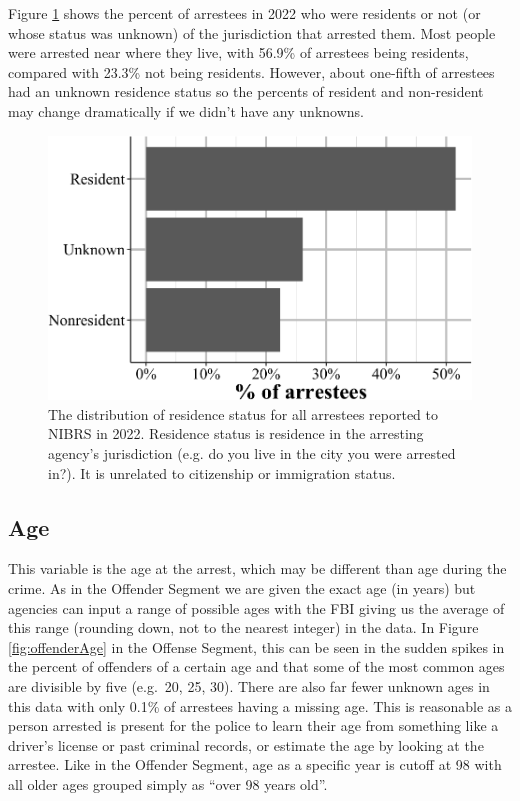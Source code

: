 \documentclass[
  12pt,
  openany]{book}
\begin{document}
Figure \ref{fig:arresteeResidenceStatus} shows the percent of arrestees in 2022 who were residents or not (or whose status was unknown) of the jurisdiction that arrested them. Most people were arrested near where they live, with 56.9\% of arrestees being residents, compared with 23.3\% not being residents. However, about one-fifth of arrestees had an unknown residence status so the percents of resident and non-resident may change dramatically if we didn't have any unknowns.

\begin{figure}

{\centering \includegraphics[width=0.9\linewidth]{16_nibrs_arrestee_files/figure-latex/arresteeResidenceStatus-1} 

}

\caption{The distribution of residence status for all arrestees reported to NIBRS in 2022. Residence status is residence in the arresting agency's jurisdiction (e.g. do you live in the city you were arrested in?). It is unrelated to citizenship or immigration status.}\label{fig:arresteeResidenceStatus}
\end{figure}

\subsection{Age}\label{age-4}

This variable is the age at the arrest, which may be different than age during the crime. As in the Offender Segment we are given the exact age (in years) but agencies can input a range of possible ages with the FBI giving us the average of this range (rounding down, not to the nearest integer) in the data. In Figure \ref{fig:offenderAge} in the Offense Segment, this can be seen in the sudden spikes in the percent of offenders of a certain age and that some of the most common ages are divisible by five (e.g.~20, 25, 30). There are also far fewer unknown ages in this data with only 0.1\% of arrestees having a missing age. This is reasonable as a person arrested is present for the police to learn their age from something like a driver's license or past criminal records, or estimate the age by looking at the arrestee. Like in the Offender Segment, age as a specific year is cutoff at 98 with all older ages grouped simply as ``over 98 years old''.
\end{document}
